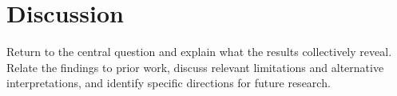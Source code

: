 \section{Discussion}

Return to the central question and explain what the results collectively reveal.
Relate the findings to prior work, discuss relevant limitations and alternative
interpretations, and identify specific directions for future research.
